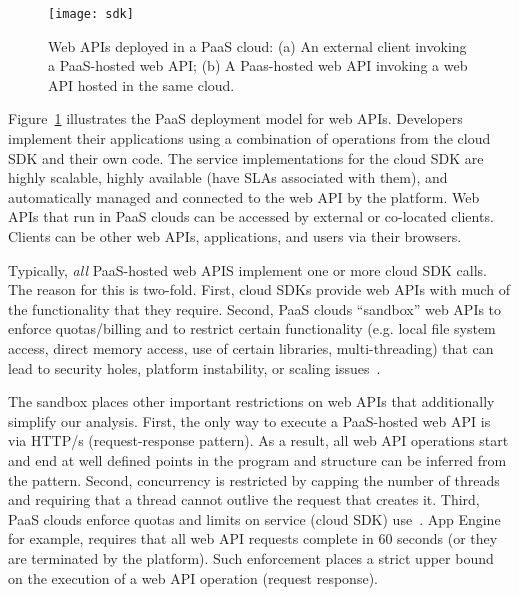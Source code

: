 \begin{figure}
\centering
\texttt{[image: sdk]}
\caption{Web APIs deployed in a PaaS cloud: (a) An external client invoking 
a PaaS-hosted web API;
(b) A Paas-hosted web API invoking a web API hosted in the same cloud.}
\label{fig:cloud_app_model}
\end{figure}

Figure~\ref{fig:cloud_app_model} illustrates the PaaS deployment model for web APIs.
Developers implement their applications using a combination of operations
from the cloud SDK and their own code.  The service implementations for the 
cloud SDK are highly scalable, highly available (have SLAs associated with them),
and automatically managed and connected to the web API by the platform.
Web APIs that run in PaaS clouds can be accessed by external or co-located clients.
Clients can be other web APIs, applications, and users via their browsers.

Typically, \textit{all} PaaS-hosted web APIS implement one or more
cloud SDK calls.  The reason for this is two-fold.  First, 
cloud SDKs provide web APIs with much of the functionality that they require.
Second, PaaS clouds ``sandbox'' web APIs to enforce quotas/billing
and to restrict certain functionality
(e.g. local file system access, direct memory access, use of certain libraries, multi-threading) that can lead to security holes, platform instability, or scaling issues~\cite{gae-sandbox}.

The sandbox places other important restrictions on web APIs that additionally
simplify our analysis.
First, the only way to execute a PaaS-hosted web API is via HTTP/s (request-response 
pattern).  As a result, 
all web API operations start and end at well defined points in the program and 
structure can be inferred from the pattern.  Second,
concurrency is restricted by capping the number of threads
and requiring that a thread cannot outlive the request
that creates it.  Third, PaaS clouds enforce quotas and limits on service
(cloud SDK) use~\cite{azure-limits,gae-limits,gae-sandbox}.
App Engine for example, requires that all web API requests complete in 60 seconds (or they are terminated by the platform).  Such enforcement places a strict upper bound on the
execution of a web API operation (request response).

